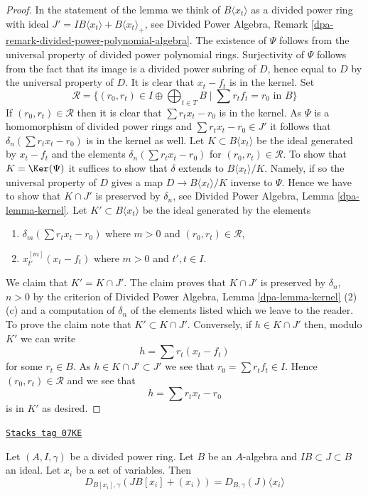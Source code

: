 \begin{proof}
In the statement of the lemma we think of $B\langle x_t \rangle$
as a divided power ring with ideal
$J' = IB\langle x_t \rangle + B\langle x_t \rangle_{+}$, see
Divided Power Algebra, Remark \ref{dpa-remark-divided-power-polynomial-algebra}.
The existence of $\Psi$ follows from the universal property of
divided power polynomial rings. Surjectivity of $\Psi$ follows from
the fact that its image is a divided power subring of $D$, hence equal to $D$
by the universal property of $D$. It is clear that
$x_t - f_t$ is in the kernel. Set
$$
\mathcal{R} = \{(r_0, r_t) \in I \oplus \bigoplus\nolimits_{t \in T} B
\mid \sum r_t f_t = r_0 \text{ in }B\}
$$
If $(r_0, r_t) \in \mathcal{R}$ then it is clear that
$\sum r_t x_t - r_0$ is in the kernel.
As $\Psi$ is a homomorphism of divided power rings
and $\sum r_tx_t - r_0 \in J'$
it follows that $\delta_n(\sum r_t x_t - r_0)$ is in the kernel as well.
Let $K \subset B\langle x_t \rangle$ be the ideal generated by
$x_t - f_t$ and the elements $\delta_n(\sum r_t x_t - r_0)$ for
$(r_0, r_t) \in \mathcal{R}$.
To show that $K = \Ker(\Psi)$ it suffices to show that
$\delta$ extends to $B\langle x_t \rangle/K$. Namely, if so the universal
property of $D$ gives a map $D \to B\langle x_t \rangle/K$
inverse to $\Psi$. Hence we have to show that $K \cap J'$ is
preserved by $\delta_n$, see
Divided Power Algebra, Lemma \ref{dpa-lemma-kernel}.
Let $K' \subset B\langle x_t \rangle$ be the ideal
generated by the elements
\begin{enumerate}
\item $\delta_m(\sum r_t x_t - r_0)$ where $m > 0$ and
$(r_0, r_t) \in \mathcal{R}$,
\item $x_{t'}^{[m]}(x_t - f_t)$ where $m > 0$ and $t', t \in I$.
\end{enumerate}
We claim that $K' = K \cap J'$. The claim proves that $K \cap J'$
is preserved by $\delta_n$, $n > 0$ by the criterion of
Divided Power Algebra, Lemma \ref{dpa-lemma-kernel} (2)(c)
and a computation of $\delta_n$
of the elements listed which we leave to the reader.
To prove the claim note that $K' \subset K \cap J'$.
Conversely, if $h \in K \cap J'$ then, modulo $K'$ we can write
$$
h = \sum r_t (x_t - f_t)
$$
for some $r_t \in B$. As $h \in K \cap J' \subset J'$
we see that $r_0 = \sum r_t f_t \in I$. Hence $(r_0, r_t) \in \mathcal{R}$
and we see that
$$
h = \sum r_t x_t - r_0
$$
is in $K'$ as desired.
\end{proof}

\begin{lemma}
\label{crystalline-lemma-divided-power-envelope-add-variables}
\href{https://stacks.math.columbia.edu/tag/07KE}{\texttt{Stacks tag 07KE}}

Let $(A, I, \gamma)$ be a divided power ring.
Let $B$ be an $A$-algebra and $IB \subset J \subset B$ an ideal.
Let $x_i$ be a set of variables. Then
$$
D_{B[x_i], \gamma}(JB[x_i] + (x_i)) = D_{B, \gamma}(J) \langle x_i \rangle
$$
\end{lemma}

